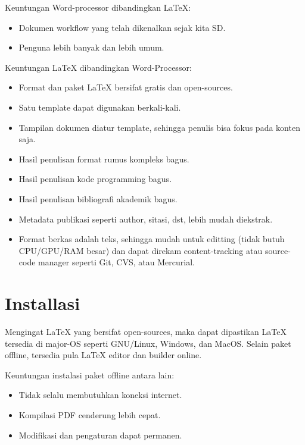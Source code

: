 \documentclass{book} %
\begin{document}
    \bigskip

    Keuntungan Word-processor dibandingkan \LaTeX{}:
    \begin{itemize}
        \item Dokumen workflow yang telah dikenalkan sejak kita SD.
        \item Penguna lebih banyak dan lebih umum.
    \end{itemize}

    \bigskip

    Keuntungan \LaTeX{} dibandingkan Word-Processor:
    \begin{itemize}
    	\item Format dan paket \LaTeX{} bersifat gratis dan open-sources.
        \item Satu template dapat digunakan berkali-kali.
        \item Tampilan dokumen diatur template, sehingga penulis bisa fokus pada konten saja.
        \item Hasil penulisan format rumus kompleks bagus.
        \item Hasil penulisan kode programming bagus.
        \item Hasil penulisan bibliografi akademik bagus.
        \item Metadata publikasi seperti author, sitasi, dst, lebih mudah diekstrak.
        \item Format berkas adalah teks, sehingga mudah untuk editting (tidak butuh CPU/GPU/RAM besar)
        dan dapat direkam content-tracking atau source-code manager seperti Git, CVS, atau Mercurial.
    \end{itemize}


	\chapter{Installasi}

	Mengingat \LaTeX{} yang bersifat open-sources, maka dapat dipastikan \LaTeX{} tersedia di major-OS seperti GNU/Linux, Windows, dan MacOS.
	Selain paket offline, tersedia pula \LaTeX{} editor dan builder online.

	\bigskip

	Keuntungan instalasi paket offline antara lain:

	\begin{itemize}
		\item Tidak selalu membutuhkan koneksi internet.
		\item Kompilasi PDF cenderung lebih cepat.
		\item Modifikasi dan pengaturan dapat permanen.
	\end{itemize}
\end{document}
